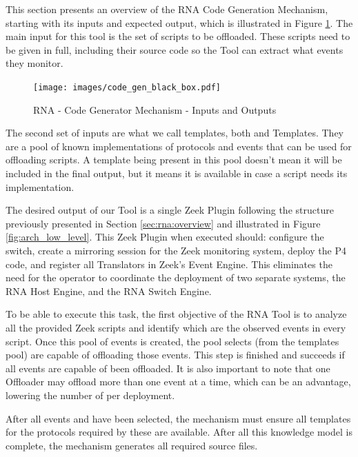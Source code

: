 This section presents an overview of the RNA Code Generation Mechanism, starting with its inputs and expected output, which is illustrated in Figure \ref{fig:code_gen_black_box}. The main input for this tool is the set of scripts to be offloaded. These scripts need to be given in full, including their source code so the Tool can extract what events they monitor.

\begin{figure}[htb]
    \caption{RNA - Code Generator Mechanism - Inputs and Outputs}
    \begin{center}
        \texttt{[image: images/code\_gen\_black\_box.pdf]}  
    \end{center}
    \label{fig:code_gen_black_box}
\end{figure}

The second set of inputs are what we call templates, both \ProtocolTemplates{} and \Offloader{} Templates. They are a pool of known implementations of protocols and events that can be used for offloading scripts. A template being present in this pool doesn't mean it will be included in the final output, but it means it is available in case a script needs its implementation.

The desired output of our Tool is a single Zeek Plugin following the structure previously presented in Section \ref{sec:rna:overview} and illustrated in Figure \ref{fig:arch_low_level}. This Zeek Plugin when executed should: configure the switch, create a mirroring session for the Zeek monitoring system, deploy the P4 code, and register all Translators in Zeek's Event Engine. This eliminates the need for the operator to coordinate the deployment of two separate systems, the RNA Host Engine, and the RNA Switch Engine.

To be able to execute this task, the first objective of the RNA Tool is to analyze all the provided Zeek scripts and identify which are the observed events in every script. Once this pool of events is created, the pool selects \Offloaders{} (from the templates pool) are capable of offloading those events. This step is finished and succeeds if all events are capable of been offloaded. It is also important to note that one Offloader may offload more than one event at a time, which can be an advantage, lowering the number of \Offloaders{} per deployment.

After all events and \Offloaders{} have been selected, the mechanism must ensure all templates for the protocols required by these \Offloaders{} are available. After all this knowledge model is complete, the mechanism generates all required source files.

